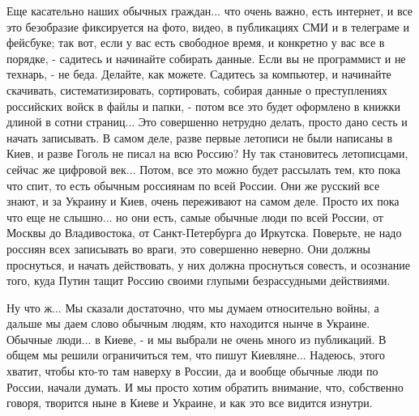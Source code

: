 Еще касательно наших обычных граждан... что очень важно, есть интернет, и все
это безобразие фиксируется на фото, видео, в публикациях СМИ и в телеграме и
фейсбуке; так вот, если у вас есть свободное время, и конкретно у вас все в
порядке, - садитесь и начинайте собирать данные. Если вы не программист и не
технарь, - не беда.  Делайте, как можете. Садитесь за компьютер, и начинайте
скачивать, систематизировать, сортировать, собирая данные о преступлениях
российских войск в файлы и папки, - потом все это будет оформлено в книжки
длиной в сотни страниц...  Это совершенно нетрудно делать, просто дано сесть и
начать записывать. В самом деле, разве первые летописи не были написаны в Киев,
и разве Гоголь не писал на всю Россию? Ну так становитесь летописцами, сейчас
же цифровой век...  Потом, все это можно будет рассылать тем, кто пока что
спит, то есть обычным россиянам по всей России. Они же русский все знают, и за
Украину и Киев, очень переживают на самом деле. Просто их пока что еще не
слышно... но они есть, самые обычные люди по всей России, от Москвы до
Владивостока, от Санкт-Петербурга до Иркутска. Поверьте, не надо россиян всех
записывать во враги, это совершенно неверно. Они должны проснуться, и начать
действовать, у них должна проснуться совесть, и осознание того, куда Путин
тащит Россию своими глупыми безрассудными действиями. 

Ну что ж... Мы сказали достаточно, что мы думаем относительно войны, а дальше
мы даем слово обычным людям, кто находится нынче в Украине. Обычные люди... в
Киеве, - и мы выбрали не очень много из публикаций. В общем мы решили
ограничиться тем, что пишут Киевляне... Надеюсь, этого хватит, чтобы кто-то там
наверху в России, да и вообще обычные люди по России, начали думать. И мы
просто хотим обратить внимание, что, собственно говоря, творится ныне в Киеве и
Украине, и как это все видится изнутри.
